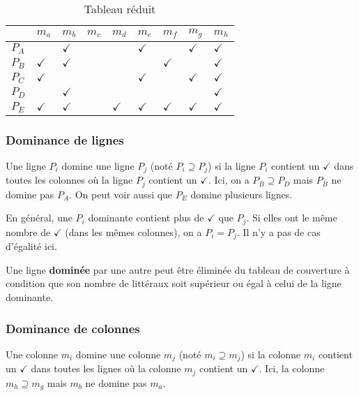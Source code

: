 \documentclass[11pt]{article}
\begin{document}
\begin{table}[htbp]
\caption{\label{tab:org8019093}Tableau réduit}
\centering
\begin{tabular}{lllllllll}
 & \(m_a\) & \(m_b\) & \(m_c\) & \(m_d\) & \(m_e\) & \(m_f\) & \(m_g\) & \(m_h\)\\
\hline
\(P_A\) &  & \(\checkmark\) &  &  & \(\checkmark\) &  & \(\checkmark\) & \(\checkmark\)\\
\(P_B\) & \(\checkmark\) & \(\checkmark\) &  &  &  & \(\checkmark\) &  & \(\checkmark\)\\
\(P_C\) & \(\checkmark\) &  &  &  & \(\checkmark\) &  & \(\checkmark\) & \(\checkmark\)\\
\(P_D\) &  & \(\checkmark\) &  &  &  &  &  & \(\checkmark\)\\
\(P_E\) & \(\checkmark\) & \(\checkmark\) &  & \(\checkmark\) & \(\checkmark\) & \(\checkmark\) & \(\checkmark\) & \(\checkmark\)\\
\end{tabular}
\end{table}


\subsubsection{Dominance de lignes}
\label{sec:org90cb7b2}

Une ligne \(P_i\) domine une ligne \(P_j\) (noté \(P_i \supseteq
P_j\)) si la ligne \(P_i\) contient un \(\checkmark\) dans toutes les colonnes où
la ligne \(P_j\) contient un \(\checkmark\). Ici, on a \(P_B \supseteq P_D\) mais
\(P_B\) ne domine pas \(P_A\). On peut voir aussi que \(P_E\) domine
plusieurs lignes.

En général, une \(P_i\) dominante contient plus de \(\checkmark\) que \(P_j\). Si
elles ont le même nombre de \(\checkmark\) (dans les mêmes colonnes), on a \(P_i =
P_j\). Il n'y a pas de cas d'égalité ici.

Une ligne \textbf{dominée} par une autre peut être éliminée du tableau de
couverture à condition que son nombre de littéraux soit supérieur ou
égal à celui de la ligne dominante.

\subsubsection{Dominance de colonnes}
\label{sec:org8dcc6df}

Une colonne \(m_i\) domine une colonne \(m_j\) (noté \(m_i \supseteq
m_j\)) si la colonne \(m_i\) contient un \(\checkmark\) dans toutes les lignes où
la colonne \(m_j\) contient un \(\checkmark\). Ici, la colonne \(m_h \supseteq
m_g\) mais \(m_b\) ne domine pas \(m_a\). 
\end{document}
